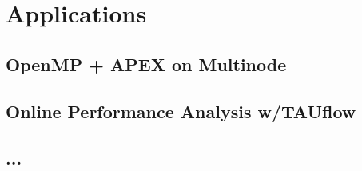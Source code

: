 
\section{Applications}
\subsection{OpenMP + APEX on Multinode}
\subsection{Online Performance Analysis w/TAUflow}
\subsection{...}


